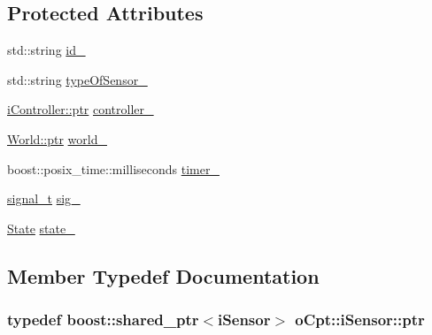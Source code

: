 \subsection*{Protected Attributes}
\begin{DoxyCompactItemize}
\item 
std\+::string \hyperlink{classo_cpt_1_1i_sensor_a4c9bd54d193ec8f2cc01eede5eadacdc}{id\+\_\+}
\item 
std\+::string \hyperlink{classo_cpt_1_1i_sensor_a37396b5c63f5e99cb6e80c266f85dbfa}{type\+Of\+Sensor\+\_\+}
\item 
\hyperlink{classo_cpt_1_1i_controller_a6d89a95cd6ad68bb74adfaca2f36370f}{i\+Controller\+::ptr} \hyperlink{classo_cpt_1_1i_sensor_a65e41d8be53d71b1db21bac89c5c3c0d}{controller\+\_\+}
\item 
\hyperlink{classo_cpt_1_1_world_aa6e591e3096d5de71e0cec9039663d67}{World\+::ptr} \hyperlink{classo_cpt_1_1i_sensor_aab033b6462d7e8710c006f19c51e033e}{world\+\_\+}
\item 
boost\+::posix\+\_\+time\+::milliseconds \hyperlink{classo_cpt_1_1i_sensor_ac2a089853910118f6b490c00fc354d77}{timer\+\_\+}
\item 
\hyperlink{classo_cpt_1_1i_sensor_a2e6d170acbc05f0b557bb68671813f6d}{signal\+\_\+t} \hyperlink{classo_cpt_1_1i_sensor_a4f4943cf2af0b1a06bf5f0d8c46d1cb8}{sig\+\_\+}
\item 
\hyperlink{structo_cpt_1_1i_sensor_1_1_state}{State} \hyperlink{classo_cpt_1_1i_sensor_ad27fe02a89f013951a05f296ec457a08}{state\+\_\+}
\end{DoxyCompactItemize}


\subsection{Member Typedef Documentation}
\subsubsection[{\texorpdfstring{ptr}{ptr}}]{\setlength{\rightskip}{0pt plus 5cm}typedef boost\+::shared\+\_\+ptr$<${\bf i\+Sensor}$>$ {\bf o\+Cpt\+::i\+Sensor\+::ptr}}\hypertarget{classo_cpt_1_1i_sensor_a03533d2c5dc66e332d70dbb3b5e3006a}{}\label{classo_cpt_1_1i_sensor_a03533d2c5dc66e332d70dbb3b5e3006a}
